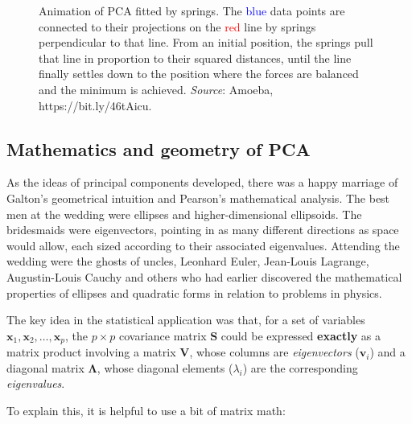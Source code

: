 \documentclass[
  letterpaper,
  10pt,
  krantz2]{krantz}
\begin{document}
{\begin{figure}

\centering{

}

\caption{\label{fig-pca-springs}Animation of PCA fitted by springs. The
\textcolor{blue}{blue} data points are connected to their projections on
the \textcolor{red}{red} line by springs perpendicular to that line.
From an initial position, the springs pull that line in proportion to
their squared distances, until the line finally settles down to the
position where the forces are balanced and the minimum is achieved.
\emph{Source}: Amoeba, https://bit.ly/46tAicu.}

\end{figure}%

\subsection{Mathematics and geometry of
PCA}\label{mathematics-and-geometry-of-pca}

As the ideas of principal components developed, there was a happy
marriage of Galton's geometrical intuition and Pearson's mathematical
analysis. The best men at the wedding were ellipses and
higher-dimensional ellipsoids. The bridesmaids were eigenvectors,
pointing in as many different directions as space would allow, each
sized according to their associated eigenvalues. Attending the wedding
were the ghosts of uncles, Leonhard Euler, Jean-Louis Lagrange,
Augustin-Louis Cauchy and others who had earlier discovered the
mathematical properties of ellipses and quadratic forms in relation to
problems in physics.

The key idea in the statistical application was that, for a set of
variables \(\mathbf{x}_1, \mathbf{x}_2, \dots, \mathbf{x}_p\), the
\(p \times p\) covariance matrix \(\mathbf{S}\) could be expressed
\textbf{exactly} as a matrix product involving a matrix \(\mathbf{V}\),
whose columns are \emph{eigenvectors} (\(\mathbf{v}_i\)) and a diagonal
matrix \(\mathbf{\Lambda}\), whose diagonal elements (\(\lambda_i\)) are
the corresponding \emph{eigenvalues}.

To explain this, it is helpful to use a bit of matrix math:

}
\end{document}
